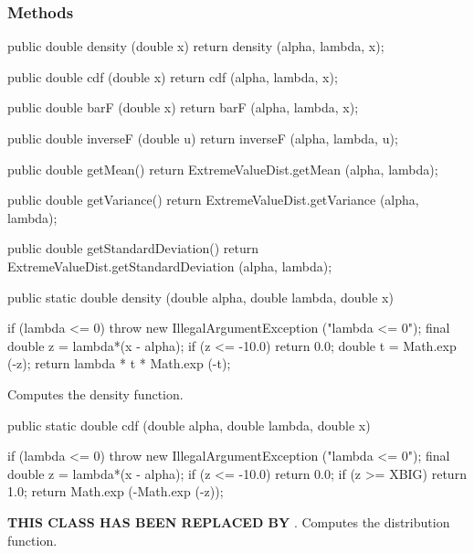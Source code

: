 \subsubsection* {Methods}
\begin{code}\begin{hide}

   public double density (double x) {
      return density (alpha, lambda, x);
   }

   public double cdf (double x) {
      return cdf (alpha, lambda, x);
   }

   public double barF (double x) {
      return barF (alpha, lambda, x);
   }

   public double inverseF (double u) {
      return inverseF (alpha, lambda, u);
   }

   public double getMean() {
      return ExtremeValueDist.getMean (alpha, lambda);
   }

   public double getVariance() {
      return ExtremeValueDist.getVariance (alpha, lambda);
   }

   public double getStandardDeviation() {
      return ExtremeValueDist.getStandardDeviation (alpha, lambda);
   }\end{hide}

   public static double density (double alpha, double lambda, double x)\begin{hide} {
      if (lambda <= 0)
         throw new IllegalArgumentException ("lambda <= 0");
      final double z = lambda*(x - alpha);
      if (z <= -10.0)
         return 0.0;
      double t = Math.exp (-z);
      return lambda * t * Math.exp (-t);
   }\end{hide}
\end{code}
\begin{tabb} Computes the density function.
\end{tabb}
\begin{code}

   public static double cdf (double alpha, double lambda, double x)\begin{hide} {
      if (lambda <= 0)
         throw new IllegalArgumentException ("lambda <= 0");
      final double z = lambda*(x - alpha);
      if (z <= -10.0)
         return 0.0;
      if (z >= XBIG)
         return 1.0;
      return Math.exp (-Math.exp (-z));
   }\end{hide}
\end{code}
 \begin{tabb}
 \textbf{THIS CLASS HAS BEEN REPLACED BY }.
 Computes  the distribution function.
 \end{tabb}
